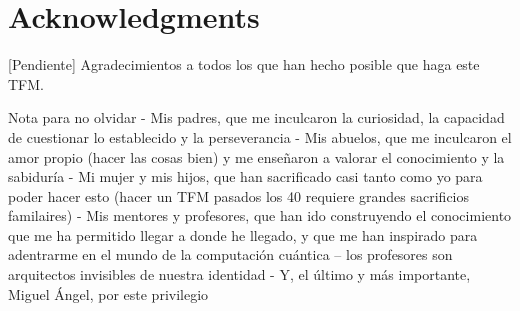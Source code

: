 \chapter*{Acknowledgments}

[Pendiente] Agradecimientos a todos los que han hecho posible que haga este TFM.

Nota para no olvidar
- Mis padres, que me inculcaron la curiosidad, la capacidad de cuestionar lo establecido y la perseverancia
- Mis abuelos, que me inculcaron el amor propio (hacer las cosas bien) y me enseñaron a valorar el conocimiento y la sabiduría
- Mi mujer y mis hijos, que han sacrificado casi tanto como yo para poder hacer esto (hacer un TFM pasados los 40 requiere grandes sacrificios familaires)
- Mis mentores y profesores, que han ido construyendo el conocimiento que me ha permitido llegar a donde he llegado, y que me han inspirado para adentrarme en el mundo de la computación cuántica -- los profesores son arquitectos invisibles de nuestra identidad
- Y, el último y más importante, Miguel Ángel, por este privilegio